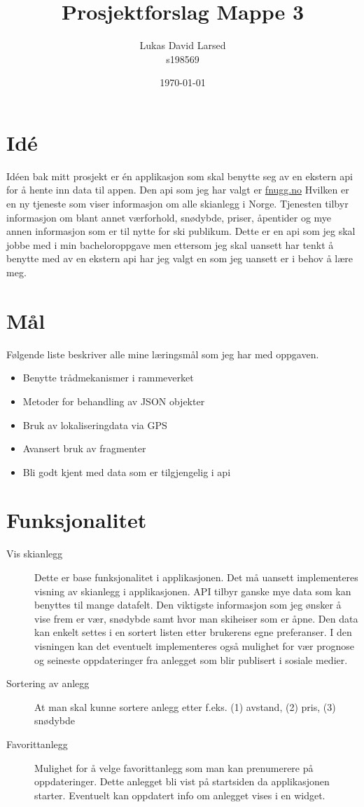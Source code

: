 \documentclass[11pt,a4paper]{article}
\author{Lukas David Larsed\\s198569}
\title{Prosjektforslag Mappe 3}
\date{\today}
\begin{document}
\maketitle

\section*{Idé}
Idéen bak mitt prosjekt er én applikasjon som skal benytte seg av en ekstern api for å hente inn data til appen. Den api som jeg har valgt er \href{http://www.fnugg.no}{fnugg.no}
Hvilken er en ny tjeneste som viser informasjon om alle skianlegg i Norge. Tjenesten tilbyr informasjon om blant annet værforhold, snødybde, priser, åpentider og mye annen informasjon som er til nytte for ski  publikum. Dette er en api som jeg skal jobbe med i min bacheloroppgave men ettersom jeg skal uansett har tenkt å benytte med av en ekstern api har jeg valgt en som jeg uansett er i behov å lære meg.

\section*{Mål}
Følgende liste beskriver alle mine læringsmål som jeg har med oppgaven.
\begin{itemize}
\item Benytte trådmekanismer i rammeverket
\item Metoder for behandling av JSON objekter
\item Bruk av lokaliseringdata via GPS
\item Avansert bruk av fragmenter
\item Bli godt kjent med data som er tilgjengelig i api
\end{itemize}



\section*{Funksjonalitet}
\begin{description}
\item[Vis skianlegg]
Dette er base funksjonalitet i applikasjonen. Det må uansett implementeres visning av skianlegg i applikasjonen. API tilbyr ganske mye data som kan benyttes til mange datafelt. Den viktigste informasjon som jeg ønsker å vise frem er vær, snødybde samt hvor man skiheiser som er åpne. Den data kan enkelt settes i en sortert listen etter brukerens egne preferanser. I den visningen kan det eventuelt implementeres også mulighet for vær prognose og seineste oppdateringer fra anlegget som blir publisert i sosiale medier. 

\item[Sortering av anlegg]
At man skal kunne sortere anlegg etter f.eks. (1) avstand, (2) pris, (3) snødybde

\item[Favorittanlegg]
Mulighet for å velge favorittanlegg som man kan prenumerere på oppdateringer. Dette anlegget bli vist på startsiden da applikasjonen starter. Eventuelt kan oppdatert info om anlegget vises i en widget.
\end{description}
\end{document}
